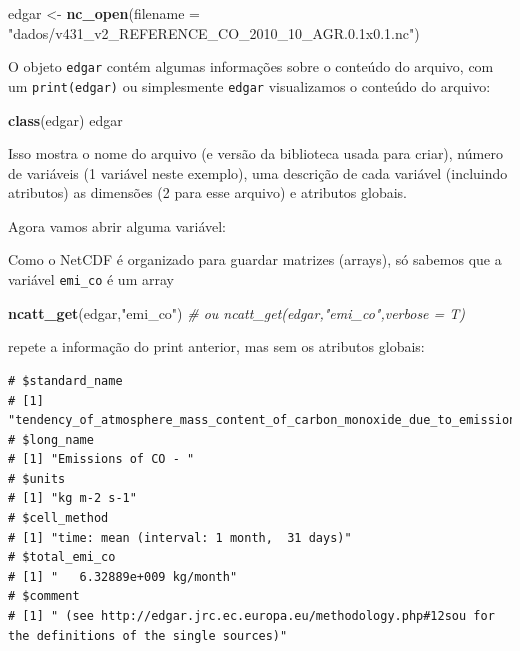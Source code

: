 \documentclass[]{book}
\newenvironment{Shaded}{\begin{snugshade}}{\end{snugshade}}
\newcommand{\KeywordTok}[1]{\textcolor[rgb]{0.13,0.29,0.53}{\textbf{#1}}}
\newcommand{\DataTypeTok}[1]{\textcolor[rgb]{0.13,0.29,0.53}{#1}}
\newcommand{\StringTok}[1]{\textcolor[rgb]{0.31,0.60,0.02}{#1}}
\newcommand{\CommentTok}[1]{\textcolor[rgb]{0.56,0.35,0.01}{\textit{#1}}}
\newcommand{\OperatorTok}[1]{\textcolor[rgb]{0.81,0.36,0.00}{\textbf{#1}}}
\newcommand{\NormalTok}[1]{#1}
\theoremstyle{definition}
\theoremstyle{definition}
\theoremstyle{definition}
\theoremstyle{remark}
\begin{document}
\begin{Shaded}
\begin{Highlighting}[]
\NormalTok{edgar <-}\StringTok{ }\KeywordTok{nc_open}\NormalTok{(}\DataTypeTok{filename =} \StringTok{"dados/v431_v2_REFERENCE_CO_2010_10_AGR.0.1x0.1.nc"}\NormalTok{)}
\end{Highlighting}
\end{Shaded}

O objeto \texttt{edgar} contém algumas informações sobre o conteúdo do
arquivo, com um \texttt{print(edgar)} ou simplesmente \texttt{edgar}
visualizamos o conteúdo do arquivo:

\begin{Shaded}
\begin{Highlighting}[]
\KeywordTok{class}\NormalTok{(edgar)}
\NormalTok{edgar}
\end{Highlighting}
\end{Shaded}

Isso mostra o nome do arquivo (e versão da biblioteca usada para criar),
número de variáveis (1 variável neste exemplo), uma descrição de cada
variável (incluindo atributos) as dimensões (2 para esse arquivo) e
atributos globais.

Agora vamos abrir alguma variável:

\begin{Shaded}
\end{Shaded}

Como o NetCDF é organizado para guardar matrizes (arrays), só sabemos
que a variável \texttt{emi\_co} é um array

\begin{Shaded}
\begin{Highlighting}[]
\KeywordTok{ncatt_get}\NormalTok{(edgar,}\StringTok{"emi_co"}\NormalTok{) }\CommentTok{# ou ncatt_get(edgar,"emi_co",verbose = T)}
\end{Highlighting}
\end{Shaded}

repete a informação do print anterior, mas sem os atributos globais:

\begin{verbatim}
# $standard_name
# [1] "tendency_of_atmosphere_mass_content_of_carbon_monoxide_due_to_emission"
# $long_name
# [1] "Emissions of CO - "
# $units
# [1] "kg m-2 s-1"
# $cell_method
# [1] "time: mean (interval: 1 month,  31 days)"
# $total_emi_co
# [1] "   6.32889e+009 kg/month"
# $comment
# [1] " (see http://edgar.jrc.ec.europa.eu/methodology.php#12sou for the definitions of the single sources)"
\end{verbatim}
\end{document}
